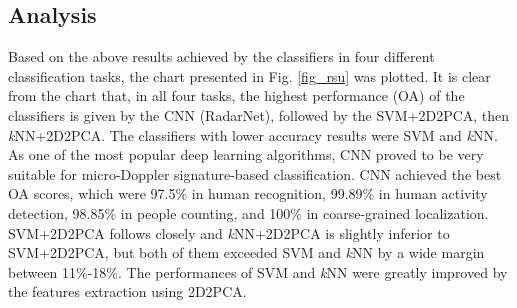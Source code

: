 \subsection{Analysis}
Based on the above results achieved by the classifiers in four different classification tasks, the chart presented in Fig. \ref{fig_rsu} was plotted. It is clear from the chart that, in all four tasks, the highest performance (OA) of the classifiers is given by the CNN (RadarNet), followed by the SVM+2D2PCA, then \textit{k}NN+2D2PCA. The classifiers with lower accuracy results were SVM and \textit{k}NN. As one of the most popular deep learning algorithms, CNN proved to be very suitable for micro-Doppler signature-based classification. CNN achieved the best OA scores, which were 97.5\% in human recognition, 99.89\% in human activity detection, 98.85\% in people counting, and 100\% in coarse-grained localization. SVM+2D2PCA follows closely and \textit{k}NN+2D2PCA is slightly inferior to SVM+2D2PCA, but both of them exceeded SVM and \textit{k}NN by a wide margin between 11\%-18\%. The performances of SVM and \textit{k}NN were greatly improved by the features extraction using 2D2PCA.   

